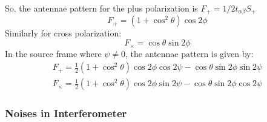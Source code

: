 \documentclass{ttuthes2007}
\begin{document}
So, the antennae pattern for the plus polarization is $F_+=1/2t_{\alpha\beta}S_+$
\begin{equation}
F_+ = (1+\cos^2\theta)\cos2\phi
\end{equation}
Similarly for cross polarization:
\begin{equation}
F_\times=\cos\theta\sin2\phi
\end{equation}
In the source frame where $\psi\neq0$, the antennae pattern is given by:
\begin{align}
F_+=\frac{1}{2}(1+\cos^2\theta)\cos2\phi\cos2\psi-\cos\theta\sin2\phi\sin2\psi\\
F_\times=\frac{1}{2}(1+\cos^2\theta)\cos2\phi\sin2\psi-\cos\theta\sin2\phi\cos2\psi
\end{align}

\subsubsection{Noises in Interferometer}
\end{document}
